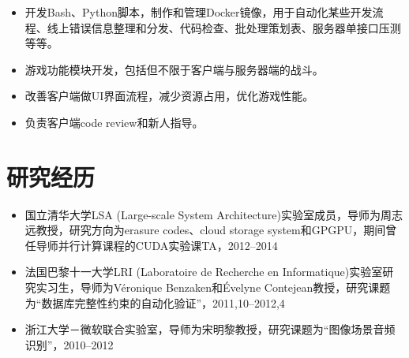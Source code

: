 \documentclass[letterpaper]{article}
\begin{document}
\begin{itemize}
\begin{itemize}
\begin{itemize}
\begin{itemize}
                        \end{itemize}
                    \item 开发Bash、Python脚本，制作和管理Docker镜像，用于自动化某些开发流程、线上错误信息整理和分发、代码检查、批处理策划表、服务器单接口压测等等。
                    \item 游戏功能模块开发，包括但不限于客户端与服务器端的战斗。
                    \item 改善客户端做UI界面流程，减少资源占用，优化游戏性能。
                    \item 负责客户端code review和新人指导。
                \end{itemize}
        \end{itemize}
\end{itemize}

\section*{研究经历}
\begin{itemize}
    \item 国立清华大学LSA (Large-scale System Architecture)实验室成员，导师为周志远教授，研究方向为erasure codes、cloud storage system和GPGPU，期间曾任导师并行计算课程的CUDA实验课TA，2012--2014
    \item 法国巴黎十一大学LRI (Laboratoire de Recherche en Informatique)实验室研究实习生，导师为V\'eronique Benzaken和\'Evelyne Contejean教授，研究课题为“数据库完整性约束的自动化验证”，2011,10--2012,4
    \item 浙江大学－微软联合实验室，导师为宋明黎教授，研究课题为“图像场景音频识别”，2010--2012
\end{itemize}
\end{document}
